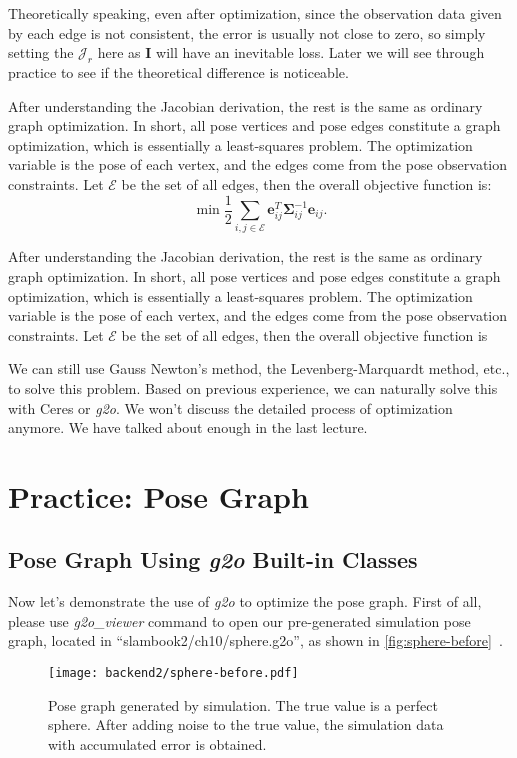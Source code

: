Theoretically speaking, even after optimization, since the observation data given by each edge is not consistent, the error is usually not close to zero, so simply setting the $\bm{\mathcal{J}}_r$ here as $\bm{I}$ will have an inevitable loss. Later we will see through practice to see if the theoretical difference is noticeable.

After understanding the Jacobian derivation, the rest is the same as ordinary graph optimization. In short, all pose vertices and pose edges constitute a graph optimization, which is essentially a least-squares problem. The optimization variable is the pose of each vertex, and the edges come from the pose observation constraints. Let $\mathcal{E}$ be the set of all edges, then the overall objective function is:
\begin{equation}
	\mathop {\min }\limits \frac{1}{2}\sum\limits_{i,j \in \mathcal{E}} \bm{e}_{ij}^T \bm{\Sigma}_{ij}^{-1} \bm{e}_{ij}.
\end{equation}

After understanding the Jacobian derivation, the rest is the same as ordinary graph optimization. In short, all pose vertices and pose edges constitute a graph optimization, which is essentially a least-squares problem. The optimization variable is the pose of each vertex, and the edges come from the pose observation constraints. Let $\mathcal{E}$ be the set of all edges, then the overall objective function is

We can still use Gauss Newton's method, the Levenberg-Marquardt method, etc., to solve this problem.  Based on previous experience, we can naturally solve this with Ceres or \textit{g2o}. We won't discuss the detailed process of optimization anymore. We have talked about enough in the last lecture.

\section{Practice: Pose Graph}
\subsection{Pose Graph Using \textit{g2o} Built-in Classes}
Now let's demonstrate the use of \textit{g2o} to optimize the pose graph. First of all, please use \textit{g2o\_viewer} command to open our pre-generated simulation pose graph, located in ``slambook2/ch10/sphere.g2o'', as shown in \autoref{fig:sphere-before}~.

\begin{figure}[!htp]
	\centering
	\texttt{[image: backend2/sphere-before.pdf]}
	\caption{Pose graph generated by simulation. The true value is a perfect sphere. After adding noise to the true value, the simulation data with accumulated error is obtained.}
	\label{fig:sphere-before}
\end{figure}


